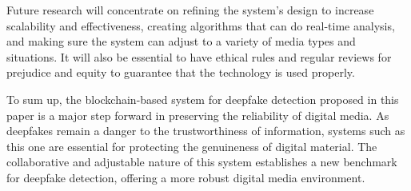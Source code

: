 \documentclass{article}
\begin{document}
Future research will concentrate on refining the system's design to increase scalability and effectiveness, creating algorithms that can do real-time analysis, and making sure the system can adjust to a variety of media types and situations. It will also be essential to have ethical rules and regular reviews for prejudice and equity to guarantee that the technology is used properly.

To sum up, the blockchain-based system for deepfake detection proposed in this paper is a major step forward in preserving the reliability of digital media. As deepfakes remain a danger to the trustworthiness of information, systems such as this one are essential for protecting the genuineness of digital material. The collaborative and adjustable nature of this system establishes a new benchmark for deepfake detection, offering a more robust digital media environment.


 
\end{document}
